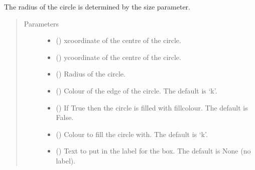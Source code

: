 \documentclass[letterpaper,10pt,english]{sphinxmanual}
\begin{document}
\begin{fulllineitems}
\begin{fulllineitems}
\sphinxAtStartPar
The radius of the circle is determined by the size parameter.
\begin{quote}\begin{description}
\item[{Parameters}] \leavevmode\begin{itemize}
\item {} 
\sphinxAtStartPar
{} () \textendash{} x\sphinxhyphen{}coordinate of the centre of the circle.

\item {} 
\sphinxAtStartPar
{} () \textendash{} y\sphinxhyphen{}coordinate of the centre of the circle.

\item {} 
\sphinxAtStartPar
{} () \textendash{} Radius of the circle.

\item {} 
\sphinxAtStartPar
{} (\sphinxstyleliteralemphasis{\sphinxupquote{, }}) \textendash{} Colour of the edge of the circle. The default is ‘k’.

\item {} 
\sphinxAtStartPar
{} (\sphinxstyleliteralemphasis{\sphinxupquote{, }}) \textendash{} If True then the circle is filled with fillcolour. The default is False.

\item {} 
\sphinxAtStartPar
{} (\sphinxstyleliteralemphasis{\sphinxupquote{, }}) \textendash{} Colour to fill the circle with. The default is ‘k’.

\item {} 
\sphinxAtStartPar
{} (\sphinxstyleliteralemphasis{\sphinxupquote{, }}) \textendash{} Text to put in the label for the box. The default is None (no label).


\end{itemize}
\end{description}
\end{quote}
\end{fulllineitems}
\end{fulllineitems}
\end{document}
